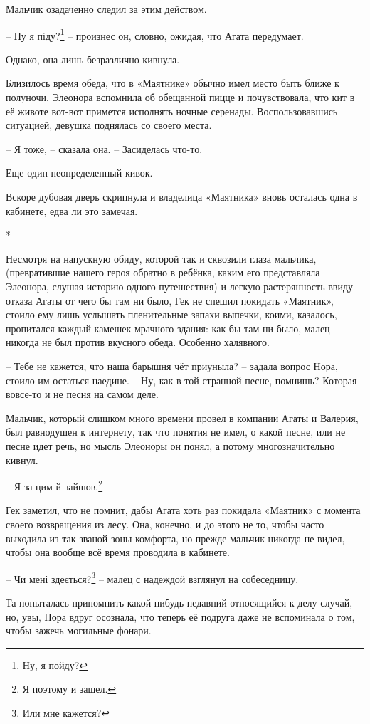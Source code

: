 \documentclass[
  a5paperpaper,
  DIV=11,
  numbers=noendperiod]{scrreprt}
\begin{document}
Мальчик озадаченно следил за этим действом.

-- Ну я піду?\footnote{Ну, я пойду?} -- произнес он, словно, ожидая, что
Агата передумает.

Однако, она лишь безразлично кивнула.

Близилось время обеда, что в «Маятнике» обычно имел место быть ближе к
полуночи. Элеонора вспомнила об обещанной пицце и почувствовала, что кит
в её животе вот-вот примется исполнять ночные серенады. Воспользовавшись
ситуацией, девушка поднялась со своего места.

-- Я тоже, -- сказала она. -- Засиделась что-то.

Еще один неопределенный кивок.

Вскоре дубовая дверь скрипнула и владелица «Маятника» вновь осталась
одна в кабинете, едва ли это замечая.

*

Несмотря на напускную обиду, которой так и сквозили глаза мальчика,
(превратившие нашего героя обратно в ребёнка, каким его представляла
Элеонора, слушая историю одного путешествия) и легкую растерянность
ввиду отказа Агаты от чего бы там ни было, Гек не спешил покидать
«Маятник», стоило ему лишь услышать пленительные запахи выпечки, коими,
казалось, пропитался каждый камешек мрачного здания: как бы там ни было,
малец никогда не был против вкусного обеда. Особенно халявного.

-- Тебе не кажется, что наша барышня чёт приуныла? -- задала вопрос
Нора, стоило им остаться наедине. -- Ну, как в той странной песне,
помнишь? Которая вовсе-то и не песня на самом деле.

Мальчик, который слишком много времени провел в компании Агаты и
Валерия, был равнодушен к интернету, так что понятия не имел, о какой
песне, или не песне идет речь, но мысль Элеоноры он понял, а потому
многозначительно кивнул.

-- Я за цим й зайшов.\footnote{Я поэтому и зашел.}

Гек заметил, что не помнит, дабы Агата хоть раз покидала «Маятник» с
момента своего возвращения из лесу. Она, конечно, и до этого не то,
чтобы часто выходила из так званой зоны комфорта, но прежде мальчик
никогда не видел, чтобы она вообще всё время проводила в кабинете.

-- Чи мені здеється?\footnote{Или мне кажется?} -- малец с надеждой
взглянул на собеседницу.

Та попыталась припомнить какой-нибудь недавний относящийся к делу
случай, но, увы, Нора вдруг осознала, что теперь её подруга даже не
вспоминала о том, чтобы зажечь могильные фонари.
\end{document}
